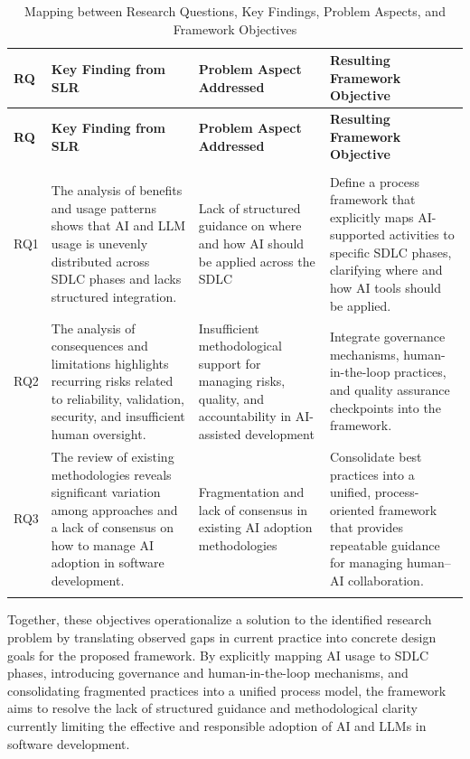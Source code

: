 {\small
\begin{longtable}{>{\raggedright\arraybackslash}p{0.6cm} 
                  >{\arraybackslash}p{5.3cm} 
                  >{\arraybackslash}p{3.2cm} 
                  >{\arraybackslash}p{5.2cm}}
\caption{Mapping between Research Questions, Key Findings, Problem Aspects, and Framework Objectives}
\label{tab:rq_objective_mapping} \\

\toprule
\textbf{RQ} & \textbf{Key Finding from SLR} & \textbf{Problem Aspect Addressed} & \textbf{Resulting Framework Objective} \\
\midrule
\endfirsthead

\toprule
\textbf{RQ} & \textbf{Key Finding from SLR} & \textbf{Problem Aspect Addressed} & \textbf{Resulting Framework Objective} \\
\midrule
\endhead

\midrule
\multicolumn{4}{r}{\textit{Continued on next page}}\\
\endfoot

\bottomrule
\endlastfoot

RQ1 &
The analysis of benefits and usage patterns shows that AI and LLM usage is unevenly distributed across SDLC phases and lacks structured integration. &
Lack of structured guidance on where and how AI should be applied across the SDLC &
Define a process framework that explicitly maps AI-supported activities to specific SDLC phases, clarifying where and how AI tools should be applied. \\
\addlinespace

RQ2 &
The analysis of consequences and limitations highlights recurring risks related to reliability, validation, security, and insufficient human oversight. &
Insufficient methodological support for managing risks, quality, and accountability in AI-assisted development &
Integrate governance mechanisms, human-in-the-loop practices, and quality assurance checkpoints into the framework. \\
\addlinespace

RQ3 &
The review of existing methodologies reveals significant variation among approaches and a lack of consensus on how to manage AI adoption in software development. &
Fragmentation and lack of consensus in existing AI adoption methodologies &
Consolidate best practices into a unified, process-oriented framework that provides repeatable guidance for managing human–AI collaboration. \\
\addlinespace

\end{longtable}
}


Together, these objectives operationalize a solution to the identified research problem by translating observed gaps in current practice into concrete design goals for the proposed framework. By explicitly mapping AI usage to SDLC phases, introducing governance and human-in-the-loop mechanisms, and consolidating fragmented practices into a unified process model, the framework aims to resolve the lack of structured guidance and methodological clarity currently limiting the effective and responsible adoption of AI and LLMs in software development.
